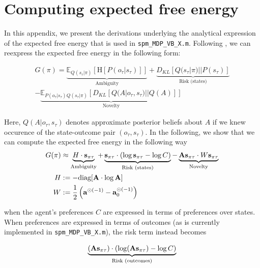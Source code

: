 \documentclass[review,12pt,authoryear]{elsarticle}
\begin{document}
\section{Computing expected free energy}
	
	In this appendix, we present the derivations underlying the analytical expression of the expected free energy that is used in \texttt{spm\_MDP\_VB\_X.m}. Following \citep{parrComputationalNeurologyActive2019}, we can reexpress the expected free energy in the following form:
	
	\begin{multline}
	\label{eq: G new expression}
		G(\pi)= \underbrace{\mathbb E_{Q(s_\tau|\pi)} [\text{H}[P(o_\tau |s_\tau)]]}_{\text{Ambiguity}} + \underbrace{D_{KL}[Q(s_\tau |\pi)||P(s_\tau)]}_{\text{Risk (states)}}  \\
		- \underbrace{\mathbb E_{P(o_\tau |s_\tau)Q(s_\tau|\pi)}[D_{KL}[Q(A|o_\tau,s_\tau)||Q(A)]]}_{\text{Novelty}}
	\end{multline}
	
	 Here, $Q(A|o_\tau,s_\tau)$ denotes approximate posterior beliefs about $A$ if we knew occurence of the state-outcome pair $(o_\tau,s_\tau)$. In the following, we show that we can compute the expected free energy in the following way
	 \begin{equation}
	 \label{eq: sol efe computation}
	     \begin{split}
	         G(\pi) &\approx \underbrace{H \cdot \bold s_{\pi \tau}}_{\text{Ambiguity}} + \underbrace{ \bold s_{\pi \tau} \cdot (\log \bold s_{\pi \tau}-\log C)}_{\text{Risk (states)}} - \underbrace{\bold A \bold s_{\pi \tau} \cdot W \bold s_{\pi \tau}}_{\text{Novelty}} \\
             H &:= - \text{diag} [\bold A\cdot \log \bold A] \\
             W &:= \frac 1 2 \left(\bold a ^{\odot (-1)}-\bold a_0^{\odot (-1)}\right)
	     \end{split}
	 \end{equation}
    
    when the agent's preferences $C$ are expressed in terms of preferences over states. When preferences are expressed in terms of outcomes (as is currently implemented in \texttt{spm\_MDP\_VB\_X.m}), the risk term instead becomes
    
    \begin{equation}
    \label{eq: sol efe computation outcomes}
		\underbrace{(\bold A \bold s_{\pi\tau}) \cdot ( \log (\bold A \bold s_{\pi\tau}) - \log C)}_{\text{Risk (outcomes)}}
	\end{equation}
	
\end{document}
